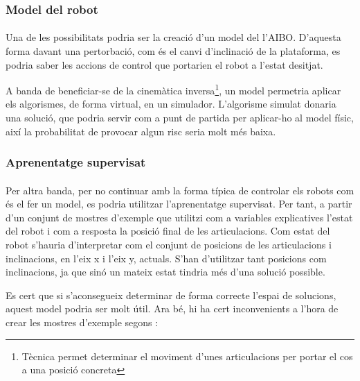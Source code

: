 \documentclass[12pt,a4paper,final,twoside]{article}
\begin{document}
\subsubsection{Model del robot}

\paragraph{}Una de les possibilitats podria ser la creació d'un model del l'AIBO. D'aquesta forma davant una pertorbació, com és el canvi d'inclinació de la plataforma, es podria saber les accions de control que portarien el robot a l'estat desitjat.

A banda de beneficiar-se de la cinemàtica inversa\footnote{Tècnica permet determinar el moviment d'unes articulacions per portar el cos a una posició concreta}, un model permetria aplicar els algorismes, de forma virtual, en un simulador. L'algorisme simulat donaria una solució, que podria servir com a punt de partida per aplicar-ho al model físic, així la probabilitat de provocar algun risc seria molt més baixa.

\subsubsection{Aprenentatge supervisat}

\paragraph{}Per altra banda, per no continuar amb la forma típica de controlar els robots com és el fer un model, es podria utilitzar l'aprenentatge supervisat. Per tant, a partir d'un conjunt de mostres d'exemple que utilitzi com a variables explicatives l'estat del robot i com a resposta la posició final de les articulacions. Com estat del robot s'hauria d'interpretar com el conjunt de posicions de les articulacions i inclinacions, en l'eix x i l'eix y, actuals. S'han d'utilitzar tant posicions com inclinacions, ja que sinó un mateix estat tindria més d'una solució possible.

Es cert que si s'aconsegueix determinar de forma correcte l'espai de solucions, aquest model podria ser molt útil. Ara bé, hi ha cert inconvenients a l'hora de crear les mostres d'exemple segons \cite{Alpaydin2004}:
\end{document}
